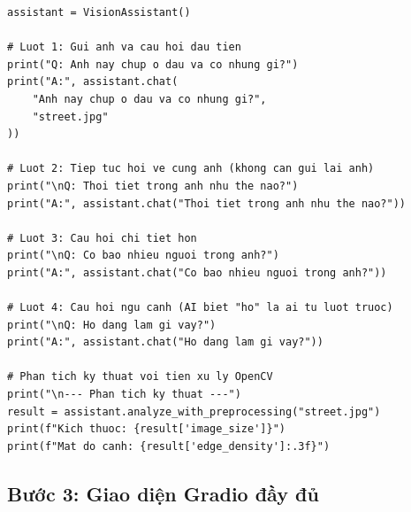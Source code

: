 \begin{verbatim}
assistant = VisionAssistant()

# Luot 1: Gui anh va cau hoi dau tien
print("Q: Anh nay chup o dau va co nhung gi?")
print("A:", assistant.chat(
    "Anh nay chup o dau va co nhung gi?",
    "street.jpg"
))

# Luot 2: Tiep tuc hoi ve cung anh (khong can gui lai anh)
print("\nQ: Thoi tiet trong anh nhu the nao?")
print("A:", assistant.chat("Thoi tiet trong anh nhu the nao?"))

# Luot 3: Cau hoi chi tiet hon
print("\nQ: Co bao nhieu nguoi trong anh?")
print("A:", assistant.chat("Co bao nhieu nguoi trong anh?"))

# Luot 4: Cau hoi ngu canh (AI biet "ho" la ai tu luot truoc)
print("\nQ: Ho dang lam gi vay?")
print("A:", assistant.chat("Ho dang lam gi vay?"))

# Phan tich ky thuat voi tien xu ly OpenCV
print("\n--- Phan tich ky thuat ---")
result = assistant.analyze_with_preprocessing("street.jpg")
print(f"Kich thuoc: {result['image_size']}")
print(f"Mat do canh: {result['edge_density']:.3f}")
\end{verbatim}

\subsection{Bước 3: Giao diện Gradio đầy đủ}
\label{subsec:va_gradio}

